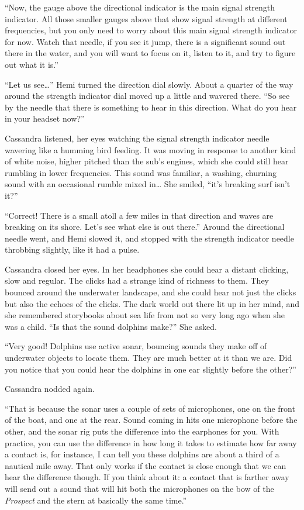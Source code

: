 \documentclass[]{scrbook}
\begin{document}
``Now, the gauge above the directional indicator is the main signal
strength indicator. All those smaller gauges above that show signal
strength at different frequencies, but you only need to worry about this
main signal strength indicator for now. Watch that needle, if you see it
jump, there is a significant sound out there in the water, and you will
want to focus on it, listen to it, and try to figure out what it is.''

``Let us see\ldots{}'' Hemi turned the direction dial slowly. About a
quarter of the way around the strength indicator dial moved up a little
and wavered there. ``So see by the needle that there is something to
hear in this direction. What do you hear in your headset now?''

Cassandra listened, her eyes watching the signal strength indicator
needle wavering like a humming bird feeding. It was moving in response
to another kind of white noise, higher pitched than the sub's engines,
which she could still hear rumbling in lower frequencies. This sound was
familiar, a washing, churning sound with an occasional rumble mixed
in\ldots{} She smiled, ``it's breaking surf isn't it?''

``Correct! There is a small atoll a few miles in that direction and
waves are breaking on its shore. Let's see what else is out there.''
Around the directional needle went, and Hemi slowed it, and stopped with
the strength indicator needle throbbing slightly, like it had a pulse.

Cassandra closed her eyes. In her headphones she could hear a distant
clicking, slow and regular. The clicks had a strange kind of richness to
them. They bounced around the underwater landscape, and she could hear
not just the clicks but also the echoes of the clicks. The dark world
out there lit up in her mind, and she remembered storybooks about sea
life from not so very long ago when she was a child. ``Is that the sound
dolphins make?'' She asked.

``Very good! Dolphins use active sonar, bouncing sounds they make off of
underwater objects to locate them. They are much better at it than we
are. Did you notice that you could hear the dolphins in one ear slightly
before the other?''

Cassandra nodded again.

``That is because the sonar uses a couple of sets of microphones, one on
the front of the boat, and one at the rear. Sound coming in hits one
microphone before the other, and the sonar rig puts the difference into
the earphones for you. With practice, you can use the difference in how
long it takes to estimate how far away a contact is, for instance, I can
tell you these dolphins are about a third of a nautical mile away. That
only works if the contact is close enough that we can hear the
difference though. If you think about it: a contact that is farther away
will send out a sound that will hit both the microphones on the bow of
the \emph{Prospect} and the stern at basically the same time.''
\end{document}
